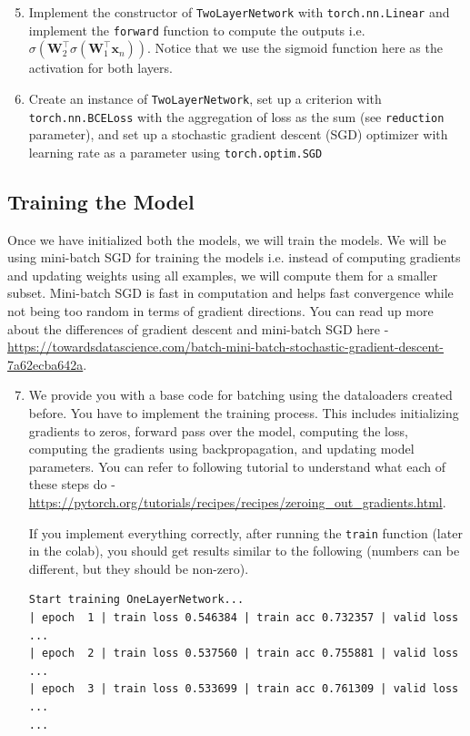 \begin{enumerate}
\setcounter{enumi}{4}

\item {}
Implement the constructor of \verb|TwoLayerNetwork| with \verb|torch.nn.Linear| and implement the \verb|forward| function to compute the outputs i.e. $\sigma(\mathbf{W}_2^\top \sigma(\mathbf{W}_1^\top \mathbf{x}_n))$. Notice that we use the sigmoid function here as the activation for both layers.

\item {}
Create an instance of \verb|TwoLayerNetwork|, set up a criterion with \verb|torch.nn.BCELoss| with the aggregation of loss as the sum (see \verb|reduction| parameter), and set up a stochastic gradient descent (SGD) optimizer with learning rate as a parameter using \verb|torch.optim.SGD| 

\end{enumerate}

\subsection{Training the Model }

Once we have initialized both the models, we will train the models. We will be using mini-batch SGD for training the models i.e. instead of computing gradients and updating weights using all examples, we will compute them for a smaller subset. Mini-batch SGD is fast in computation and helps fast convergence while not being too random in terms of gradient directions. You can read up more about the differences of gradient descent and mini-batch SGD here - \url{https://towardsdatascience.com/batch-mini-batch-stochastic-gradient-descent-7a62ecba642a}.

\begin{enumerate}
\setcounter{enumi}{6}

\item {}
We provide you with a base code for batching using the dataloaders created before. You have to implement the training process. This includes initializing gradients to zeros, forward pass over the model, computing the loss, computing the gradients using backpropagation, and updating model parameters. You can refer to following tutorial to understand what each of these steps do - \url{https://pytorch.org/tutorials/recipes/recipes/zeroing_out_gradients.html}.

If you implement everything correctly, after running the \verb|train| function (later in the colab), you should get results similar to the following (numbers can be different, but they should be non-zero). 

\begin{verbatim}
Start training OneLayerNetwork...
| epoch  1 | train loss 0.546384 | train acc 0.732357 | valid loss ...
| epoch  2 | train loss 0.537560 | train acc 0.755881 | valid loss ...
| epoch  3 | train loss 0.533699 | train acc 0.761309 | valid loss ...
...
\end{verbatim}

\end{enumerate}

